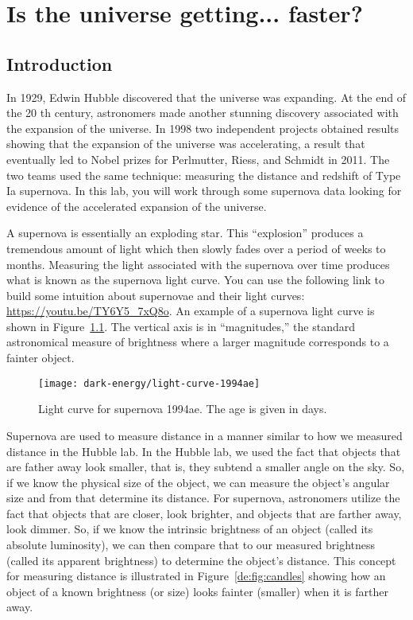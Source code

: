 \chapter{Is the universe getting... faster?}

\section{Introduction}

In 1929, Edwin Hubble discovered that the universe was expanding. At
the end of the 20 th century, astronomers made another stunning
discovery associated with the expansion of the universe. In 1998 two
independent projects obtained results showing that the expansion of
the universe was accelerating, a result that eventually led to Nobel
prizes for Perlmutter, Riess, and Schmidt in 2011. The two teams used
the same technique: measuring the distance and redshift of Type Ia
supernova. In this lab, you will work through some supernova data
looking for evidence of the accelerated expansion of the universe.

A supernova is essentially an exploding star. This ``explosion'' produces
a tremendous amount of light which then slowly fades over a period of
weeks to months. Measuring the light associated with the supernova
over time produces what is known as the supernova light curve. You can
use the following link to build some intuition about supernovae and
their light curves: \url{https://youtu.be/TY6Y5_7xQ8o}. An example of a
supernova light curve is shown in Figure~\ref{de:fig:light-curve}. The vertical axis is in ``magnitudes,'' the
standard astronomical measure of brightness where a larger magnitude
corresponds to a fainter object.

\begin{figure}
	\centering
	\texttt{[image: dark-energy/light-curve-1994ae]}
	\caption{Light curve for supernova 1994ae. The age is given in days.}\label{de:fig:light-curve}
\end{figure}

Supernova are used to measure distance in a manner similar to how we
measured distance in the Hubble lab. In the Hubble lab, we used the fact
that objects that are father away look smaller, that is, they subtend a
smaller angle on the sky. So, if we know the physical size of the object,
we can measure the object’s angular size and from that determine its
distance. For supernova, astronomers utilize the fact that objects that
are closer, look brighter, and objects that are farther away, look dimmer.
So, if we know the intrinsic brightness of an object (called its absolute
luminosity), we can then compare that to our measured brightness
(called its apparent brightness) to determine the object’s distance. This
concept for measuring distance is illustrated in Figure~\ref{de:fig:candles} showing how an object of a known brightness (or size) looks fainter
(smaller) when it is farther away.

